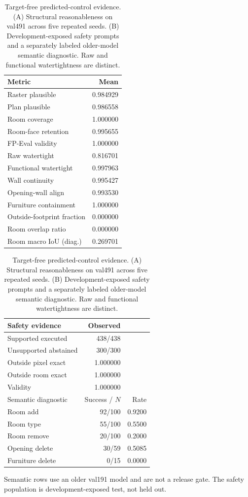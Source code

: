 \begin{table}[t]
\centering
\caption{Target-free predicted-control evidence. (A) Structural reasonableness on val491 across five repeated seeds. (B) Development-exposed safety prompts and a separately labeled older-model semantic diagnostic. Raw and functional watertightness are distinct.}
\label{tab:predicted}
\small
\begin{minipage}[t]{0.52\linewidth}
\centering
\begin{tabular}{lr}
\toprule
Metric & Mean \\
\midrule
Raster plausible & 0.984929 \\
Plan plausible & 0.986558 \\
Room coverage & 1.000000 \\
Room-face retention & 0.995655 \\
FP-Eval validity & 1.000000 \\
Raw watertight & 0.816701 \\
Functional watertight & 0.997963 \\
Wall continuity & 0.995427 \\
Opening-wall align & 0.993530 \\
Furniture containment & 1.000000 \\
Outside-footprint fraction & 0.000000 \\
Room overlap ratio & 0.000000 \\
Room macro IoU (diag.) & 0.269701 \\
\bottomrule
\end{tabular}
\end{minipage}\hfill
\begin{minipage}[t]{0.45\linewidth}
\centering
\begin{tabular}{lrr}
\toprule
Safety evidence & Observed & \\
\midrule
Supported executed & 438/438 & \\
Unsupported abstained & 300/300 & \\
Outside pixel exact & 1.000000 & \\
Outside room exact & 1.000000 & \\
Validity & 1.000000 & \\
\midrule
Semantic diagnostic & Success / $N$ & Rate \\
\midrule
Room add & 92/100 & 0.9200 \\
Room type & 55/100 & 0.5500 \\
Room remove & 20/100 & 0.2000 \\
Opening delete & 30/59 & 0.5085 \\
Furniture delete & 0/15 & 0.0000 \\
\bottomrule
\end{tabular}
\end{minipage}
\par\smallskip\footnotesize Semantic rows use an older val191 model and are not a release gate. The safety population is development-exposed test, not held out.
\end{table}
